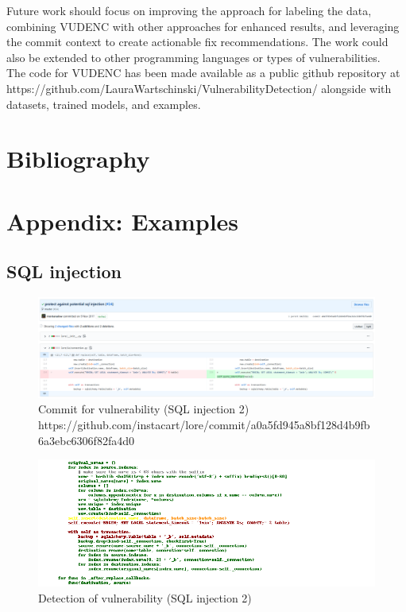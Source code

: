 \documentclass[
a4paper,
pagesize,
pdftex,
12pt,
twoside, %
BCOR=5mm, %
ngerman,
fleqn,
final,
]{scrartcl}
\begin{document}
	Future work should focus on improving the approach for labeling the data, combining VUDENC with other approaches for enhanced results, and leveraging the commit context to create actionable fix recommendations. The work could also be extended to other programming languages or types of vulnerabilities.\\
	The code for VUDENC has been made available as a public github repository at https://github.com/LauraWartschinski/VulnerabilityDetection/ alongside with datasets, trained models, and examples.
		
	
	\newpage
	\section{Bibliography}
	
	
	
	
	
	
	\setcounter{secnumdepth}{5} %
	
	
	
	\appendix
	\section*{Appendix: Examples}
	\renewcommand{\thesubsection}{\Alph{subsection}}
	



\subsection{SQL injection}

\begin{figure}[H]
	\centering
	\includegraphics[width=\linewidth]{Images/sqlA}
	\caption{Commit for vulnerability (SQL injection 2) \newline \scriptsize{https://github.com/instacart/lore/commit/a0a5fd945a8bf128d4b9fb6a3ebc6306f82fa4d0}}
	\label{fig:sqlA}
\end{figure}
\begin{figure}[H]
	\centering
	\includegraphics[width=\linewidth]{Images/sqlAr}
	\caption{Detection of vulnerability (SQL injection 2)}
	\label{fig:sqlAr}
\end{figure}
\end{document}
